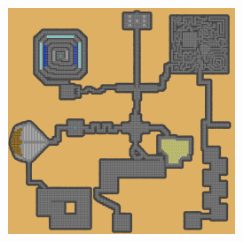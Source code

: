 \documentclass[a4paper, landscape]{article}
\begin{document}
\begin{multicols}{4}
\begin{figure}[H]
\includegraphics[trim = 4287 1930 590 2474, clip, height = 19cm, width = 6cm]{Dungeon_playersmap.png}
		\end{figure}
	\end{multicols}
\clearpage
\end{document}
